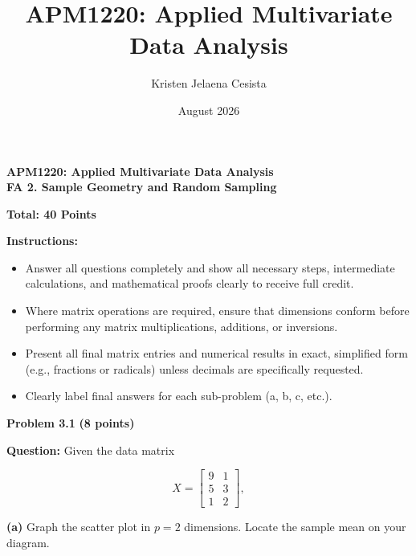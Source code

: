 \documentclass{article}
\title{APM1220: Applied Multivariate Data Analysis}
\author{Kristen Jelaena Cesista}
\date{August 2026}
\begin{document}

\noindent
\textbf{APM1220: Applied Multivariate Data Analysis}\\
\textbf{FA 2. Sample Geometry and Random Sampling}

\vspace{0.5cm}

\noindent
\textbf{Total: 40 Points}

\vspace{0.5cm}

\noindent
\textbf{Instructions:}

\begin{itemize}
    \item Answer all questions completely and show all necessary steps,
    intermediate calculations, and mathematical proofs clearly to receive
    full credit.

    \item Where matrix operations are required, ensure that dimensions
    conform before performing any matrix multiplications, additions, or
    inversions.

    \item Present all final matrix entries and numerical results in exact,
    simplified form (e.g., fractions or radicals) unless decimals are
    specifically requested.

    \item Clearly label final answers for each sub-problem (a, b, c, etc.).
\end{itemize}

\vspace{0.5cm}


\noindent
{\Large \textbf{Problem 3.1}}
\hfill
{\large \textbf{(8 points)}}

\vspace{0.3cm}

\noindent
\textbf{Question:} Given the data matrix

$$
X =
\begin{bmatrix}
9 & 1\\
5 & 3\\
1 & 2
\end{bmatrix},
$$

\noindent
\textbf{(a)} Graph the scatter plot in $p=2$ dimensions. Locate the
sample mean on your diagram.
\end{document}
